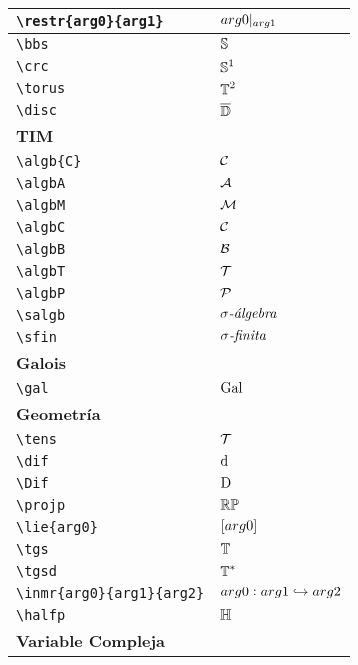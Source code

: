 \begin{longtable}{|p{3.5cm}|p{2cm}|}
\verb|\restr{arg0}{arg1}| & $\displaystyle{arg0}|_{arg1}$ \\ \midrule 
\verb|\bbs| & $\displaystyle\mathbb{S}$ \\ \midrule 
\verb|\crc| & $\displaystyle\mathbb{S}^1$ \\ \midrule 
\verb|\torus| & $\displaystyle\mathbb{T}^2$ \\ \midrule 
\verb|\disc| & $\displaystyle\overline{\mathbb{D}}$ \\ \midrule 
\bottomrule \multicolumn{2}{|p{5.5cm}|}{\textbf{TIM}} \\ \toprule 
\verb|\algb{C}| & $\displaystyle\mathcal{C}$ \\ \midrule 
\verb|\algbA| & $\displaystyle\mathcal{A}$ \\ \midrule 
\verb|\algbM| & $\displaystyle\mathcal{M}$ \\ \midrule 
\verb|\algbC| & $\displaystyle\mathcal{C}$ \\ \midrule 
\verb|\algbB| & $\displaystyle\mathcal{B}$ \\ \midrule 
\verb|\algbT| & $\displaystyle\mathcal{T}$ \\ \midrule 
\verb|\algbP| & $\displaystyle\mathcal{P}$ \\ \midrule 
\verb|\salgb| & $\displaystyle\sigma \textit{-\'{a}lgebra}$ \\ \midrule 
\verb|\sfin| & $\displaystyle\sigma \textit{-finita}$ \\ \midrule 
\bottomrule \multicolumn{2}{|p{5.5cm}|}{\textbf{Galois}} \\ \toprule 
\verb|\gal| & $\displaystyle\mathrm{Gal}\,$ \\ \midrule 
\bottomrule \multicolumn{2}{|p{5.5cm}|}{\textbf{Geometría}} \\ \toprule 
\verb|\tens| & $\displaystyle\mathcal{T}$ \\ \midrule 
\verb|\dif| & $\displaystyle\operatorname{d\!}{}$ \\ \midrule 
\verb|\Dif| & $\displaystyle\operatorname{D\!}{}$ \\ \midrule 
\verb|\projp| & $\displaystyle\mathbb{RP}$ \\ \midrule 
\verb|\lie{arg0}| & $\displaystyle\left[arg0\right]$ \\ \midrule 
\verb|\tgs| & $\displaystyle\mathbb{T}$ \\ \midrule 
\verb|\tgsd| & $\displaystyle\mathbb{T}^*$ \\ \midrule 
\verb|\inmr{arg0}{arg1}{arg2}| & $\displaystyle arg0 : arg1 \hookrightarrow arg2$ \\ \midrule 
\verb|\halfp| & $\displaystyle\mathbb{H}$ \\ \midrule 
\bottomrule \multicolumn{2}{|p{5.5cm}|}{\textbf{Variable Compleja}} \\ \toprule 

\end{longtable}
